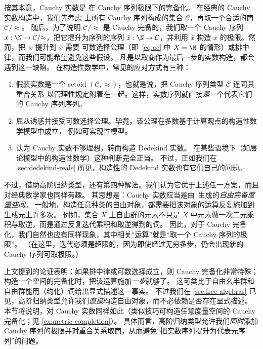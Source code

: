 %
%
%
按其本意，Cauchy 实数是 \Q 在 Cauchy 序列极限下的完备化。
在经典的 Cauchy 实数构造中，我们先考虑 \Q 上所有 Cauchy 序列构成的集合 $\mathcal{C}$，再取一个合适的商 $\mathcal{C}/{\approx}$。
随后，为了说明 $\mathcal{C}/{\approx}$ 是 Cauchy 完备的，我们取一个 Cauchy 序列 $x : \N \to \mathcal{C}/{\approx}$，把它提升为序列的序列 $\bar{x} : \N \to \mathcal{C}$，并利用 $\bar{x}$ 构造 $x$ 的极限。然而，把~$x$ 提升到 $\bar{x}$ 需要
可数选择公理（即~\eqref{eq:ac} 中 $X=\N$ 的情形）或排中律，而我们可能希望避免这些假设。
%
凡是以取商作为最后一步的实数构造，都会遇到这一缺陷。
在构造性数学中，常见的应对方式有三种：
%
%
%
\begin{enumerate}
\item 假装实数是一个 setoid $(\mathcal{C}, {\approx})$，也就是说，把
  Cauchy 序列类型 $\mathcal{C}$ 连同其重合关系
  以管理性规定附着在一起。这样，实数序列就直接\emph{是}一个代表它们的 Cauchy
  序列序列。
\item 屈从诱惑并接受可数选择公理。毕竟，该公理在多数基于计算观点的构造性数学模型中成立，
  例如可实现性模型。
\item 认为 Cauchy 实数不够理想，转而构造 Dedekind 实数。
  在某些语境下（如层论模型中的构造性数学）这种判断完全正当。
  不过，正如我们在 \cref{sec:dedekind-reals} 所见，构造性的 Dedekind 实数也有它们自己的问题。
\end{enumerate}

不过，借助高阶归纳类型，还有第四种解法。我们认为它优于上述任一方案，而且对经典数学家也同样有趣。
其思想是：Cauchy 实数应当是由~\Q 生成的\emph{自由完备度量空间}。
一般地，构造任意种类的自由对象，都需要把该对象的运算反复施加到生成元上许多次。
例如，集合 $X$ 上自由群的元素不只是 $X$ 中元素做一次二元乘积与取逆，而是通过反复迭代乘积和取逆得到的词。
因此，对于 Cauchy 完备化，我们自然也应有同样现象，其中相关“运算”就是“取一个 Cauchy 序列的极限”。
（在这里，迭代必须是超限的，因为即使经过无穷多步，仍会出现新的 Cauchy 序列可取极限。）

上文提到的论证表明：如果排中律或可数选择成立，则 Cauchy 完备化非常特殊；构造一个空间的完备化时，把该运算施加\emph{一步}就够了。
这可类比于自由幺半群和自由群能用（约化）词给出显式描述这一事实。
不过我们在 \cref{sec:free-algebras} 已见，高阶归纳类型允许我们\emph{直接}构造自由对象，而不必依赖是否存在显式描述。
本节将说明，对 Cauchy 实数同样如此（类似技巧可构造任意度量空间的 Cauchy 完备化；见 \cref{ex:metric-completion}）。
具体而言，高阶归纳类型允许我们\emph{同时}添加 Cauchy 序列的极限并对重合关系取商，从而避免“把实数序列提升为代表元序列”的问题。
%


